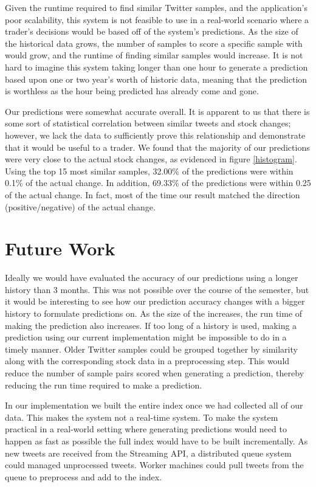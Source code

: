 \documentclass[twocolumn]{article}
\begin{document}
Given the runtime required to find similar Twitter samples, and the application’s poor scalability, this system is not feasible to use in a real-world scenario where a trader’s decisions would be based off of the system’s predictions. As the size of the historical data grows, the number of samples to score a specific sample with would grow, and the runtime of finding similar samples would increase. It is not hard to imagine this system taking longer than one hour to generate a prediction based upon one or two year’s worth of historic data, meaning that the prediction is worthless as the hour being predicted has already come and gone.

Our predictions were somewhat accurate overall. It is apparent to us that there is some sort of statistical correlation between similar tweets and stock changes; however, we lack the data to sufficiently prove this relationship and demonstrate that it would be useful to a trader. We found that the majority of our predictions were very close to the actual stock changes, as evidenced in figure \ref{histogram}. Using the top 15 most similar samples, 32.00\% of the predictions were within 0.1\% of the actual change. In addition, 69.33\% of the predictions were within 0.25 of the actual change. In fact, most of the time our result matched the direction (positive/negative) of the actual change. 

\section{Future Work}
Ideally we would have evaluated the accuracy of our predictions using a longer history than 3 months. This was not possible over the course of the semester, but it would be interesting to see how our prediction accuracy changes with a bigger history to formulate predictions on. As the size of the increases, the run time of making the prediction also increases. If too long of a history is used, making a prediction using our current implementation might be impossible to do in a timely manner. Older Twitter samples could be grouped together by similarity along with the corresponding stock data in a preprocessing step. This would reduce the number of sample pairs scored when generating a prediction, thereby reducing the run time required to make a prediction.

In our implementation we built the entire index once we had collected all of our data. This makes the system not a real-time system. To make the system practical in a real-world setting where generating predictions would need to happen as fast as possible the full index would have to be built incrementally. As new tweets are received from the Streaming API, a distributed queue system could managed unprocessed tweets. Worker machines could pull tweets from the queue to preprocess and add to the index.
\end{document}
